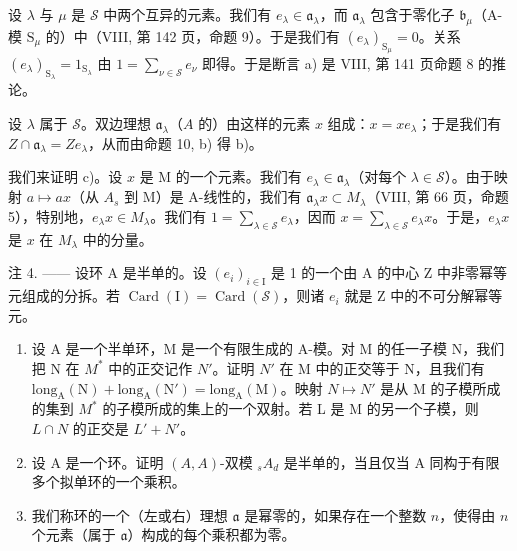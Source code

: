 设 \(\lambda\) 与 \(\mu\) 是 \(\mathcal{S}\) 中两个互异的元素。我们有 \(e_{\lambda} \in \mathfrak{a}_{\lambda}\)，而 \(\mathfrak{a}_{\lambda}\) 包含于零化子 \(\mathfrak{b}_{\mu}\)（A-模 \(\mathrm{S}_{\mu}\) 的）中（VIII, 第 142 页，命题 9）。于是我们有 \((e_{\lambda})_{\mathrm{S}_{\mu}} = 0\)。关系 \((e_{\lambda})_{\mathrm{S}_{\lambda}} = 1_{\mathrm{S}_{\lambda}}\) 由 \(1 = \sum_{\nu \in \mathcal{S}} e_{\nu}\) 即得。于是断言 a) 是 VIII, 第 141 页命题 8 的推论。

设 \(\lambda\) 属于 \(\mathcal{S}\)。双边理想 \(\mathfrak{a}_{\lambda}\)（\(A\) 的）由这样的元素 \(x\) 组成：\(x = xe_{\lambda}\)；于是我们有 \(Z \cap \mathfrak{a}_{\lambda} = Ze_{\lambda}\)，从而由命题 10, b) 得 b)。

我们来证明 c)。设 \(x\) 是 M 的一个元素。我们有 \(e_{\lambda} \in \mathfrak{a}_{\lambda}\)（对每个 \(\lambda \in \mathcal{S}\)）。由于映射 \(a \mapsto ax\)（从 \(A_s\) 到 M）是 A-线性的，我们有 \(\mathfrak{a}_{\lambda}x \subset M_{\lambda}\)（VIII, 第 66 页，命题 5），特别地，\(e_{\lambda}x \in M_{\lambda}\)。我们有 \(1 = \sum_{\lambda \in \mathcal{S}} e_{\lambda}\)，因而 \(x = \sum_{\lambda \in \mathcal{S}} e_{\lambda}x\)。于是，\(e_{\lambda}x\) 是 \(x\) 在 \(M_{\lambda}\) 中的分量。

注 4. —— 设环 A 是半单的。设 \((e_{i})_{i\in\mathrm{I}}\) 是 1 的一个由 A 的中心 Z 中非零幂等元组成的分拆。若 \(\operatorname{Card}(\mathrm{I})=\operatorname{Card}(\mathcal{S})\)，则诸 \(e_{i}\) 就是 Z 中的不可分解幂等元。


\begin{enumerate}
\def\labelenumi{\arabic{enumi})}
\item
  设 A 是一个半单环，M 是一个有限生成的 A-模。对 M 的任一子模 N，我们把 N 在 \(M^{*}\) 中的正交记作 \(N'\)。证明 \(N'\) 在 M 中的正交等于 N，且我们有 \(\text{long}_{\text{A}}(\text{N}) + \text{long}_{\text{A}}(\text{N}') = \text{long}_{\text{A}}(\text{M})\)。映射 \(N \mapsto N'\) 是从 M 的子模所成的集到 \(M^{*}\) 的子模所成的集上的一个双射。若 L 是 M 的另一个子模，则 \(L \cap N\) 的正交是 \(L' + N'\)。
\item
  设 A 是一个环。证明 \((A,A)\)-双模 \(_{s}A_{d}\) 是半单的，当且仅当 A 同构于有限多个拟单环的一个乘积。
\item
  我们称环的一个（左或右）理想 \(\mathfrak{a}\) 是幂零的，如果存在一个整数 \(n\)，使得由 \(n\) 个元素（属于 \(\mathfrak{a}\)）构成的每个乘积都为零。
\end{enumerate}

